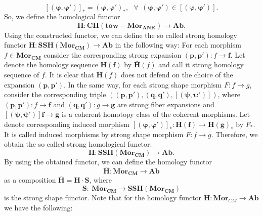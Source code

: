 \documentclass[10pt]{article}
\theoremstyle{definition}
\begin{document}
$${{\left[ ( \mathbf{\varphi },\mathbf{{\varphi }'} ) \right]}_{*}}={{( {{\mathbf{\varphi }}},\mathbf{{\varphi}' })}_{*}},~~~\forall ~~( {{\mathbf{\varphi }}},\mathbf{{\varphi}' } )\in \left[ ( \mathbf{\varphi },\mathbf{{\varphi }'} ) \right].$$            
So, we define the homological functor
$$\mathbf{{H}}:\mathbf{CH}( \mathbf{tow}-\mathbf{Mo}{{\mathbf{r}}_{\mathbf{ANR}}} )\to \mathbf{Ab}.$$                     
Using the constructed functor, we can define the so called strong homology functor $\mathbf{{H}}:\mathbf{SSH}( \mathbf{Mor}_{\mathbf{CM}} )\to \mathbf{Ab}$ in the following way: For each morphism $f\in \mathbf{Mo}{{\mathbf{r}}_{\mathbf{CM}}}$ consider the corresponding strong expansion $( \mathbf{p},\mathbf{{p}'} ):f\to \mathbf{f}$. Let denote the homology sequence $\mathbf{{H}}( \mathbf{f} )$ by $\mathbf{\bar{H}}( f )$ and call it strong homology sequence of $f$.  It is clear that $\mathbf{\bar{H}}( f )$ does not defend on the choice of the expansion $( \mathbf{p},\mathbf{{p}'} )$. In the same way, for each strong shape morphism $F:f\to g$, consider the corresponding triple $( ( \mathbf{p},\mathbf{p'} ),( \mathbf{q},\mathbf{q'} ),\left[ ( \mathbf{\psi },\mathbf{{\psi }'} ) \right] )$, where $( \mathbf{p},\mathbf{{p}'} ):f\to \mathbf{f}$ and $( \mathbf{q},\mathbf{{q}'} ):g\to \mathbf{g}$ are strong fiber expansions and $\left[ ( \mathbf{\psi },\mathbf{{\psi }'} ) \right]\mathbf{f}\to \mathbf{g}$ is a coherent homotopy class of the coherent morphisms. Let denote corresponding induced morphism  ${{\left[ ( \mathbf{\varphi },\mathbf{{\varphi }'} ) \right]}_{*}}:\mathbf{{H}}( \mathbf{f} )\to \mathbf{{H}}{{( \mathbf{g} )}_{*}}$ by ${{F}_{*}}$. It is called induced morphisms by strong shape morphism $F:f\to g$. Therefore, we obtain the so called strong homological functor:
$$\mathbf{{H}}:\mathbf{SSH}( \mathbf{Mo}{{\mathbf{r}}_{\mathbf{CM}}} )\to \mathbf{Ab}. $$                      
By using the obtained functor, we can define the homology functor
$$\mathbf{\bar{H}}:{\mathbf {Mor}}_{\mathbf{CM}}\to \mathbf{Ab}$$                             
as a composition $\mathbf{\bar{H}}=\mathbf{{H}}\cdot \mathbf{S}$, where 
$$\mathbf{S}:~{\mathbf{Mor}}_{\mathbf{CM}}\to \mathbf{SSH}( \mathbf{Mo}{{\mathbf{r}}_{\mathbf{CM}}} )$$                       
is the strong shape functor. Note that for the homology functor  $\mathbf{\bar{H}}: \mathbf{Mor}_{CM}\to \mathbf{Ab}$ we have the following:
\end{document}
